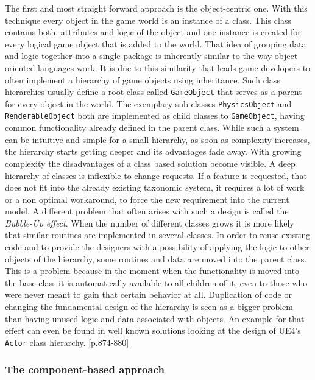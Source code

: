The first and most straight forward approach is the object-centric one. With this technique every object in the game world is an instance of a class. This class contains both, attributes and logic of the object and one instance is created for every logical game object that is added to the world. That idea of grouping data and logic together into a single package is inherently similar to the way object oriented languages work. It is due to this similarity that leads game developers to often implement a hierarchy of game objects using inheritance. Such class hierarchies usually define a root class called \texttt{GameObject} that serves as a parent for every object in the world. The exemplary sub classes \texttt{PhysicsObject} and \texttt{RenderableObject} both are implemented as child classes to \texttt{GameObject}, having common functionality already defined in the parent class. While such a system can be intuitive and simple for a small hierarchy, as soon as complexity increases, the hierarchy starts getting deeper and its advantages fade away. With growing complexity the disadvantages of a class based solution become visible. A deep hierarchy of classes is inflexible to change requests. If a feature is requested, that does not fit into the already existing taxonomic system, it requires a lot of work or a non optimal workaround, to force the new requirement into the current model. 
A different problem that often arises with such a design is called the \textit{Bubble-Up effect}. When the number of different classes grows it is more likely that similar routines are implemented in several classes. In order to reuse existing code and to provide the designers with a possibility of applying the logic to other objects of the hierarchy, some routines and data are moved into the parent class. This is a problem because in the moment when the functionality is moved into the base class it is automatically available to all children of it, even to those who were never meant to gain that certain behavior at all. Duplication of code or changing the fundamental design of the hierarchy is seen as a bigger problem than having unused logic and data associated with objects. An example for that effect can even be found in well known solutions looking at the design of \ac{UE4}'s \texttt{Actor} class hierarchy. \cite{GEA_2}[p.874-880]

\subsubsection{The component-based approach} \label{ecs_theory}

